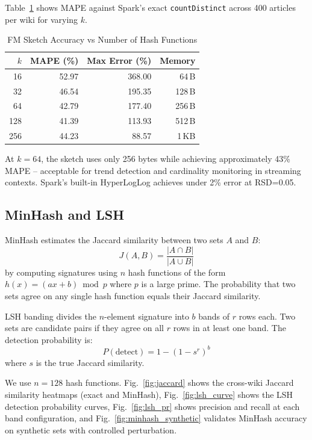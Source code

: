 \documentclass[conference]{IEEEtran}
\begin{document}
Table~\ref{tab:fm} shows MAPE against Spark's exact \texttt{countDistinct} across 400 articles per wiki for varying $k$.

\begin{table}[htbp]
\caption{FM Sketch Accuracy vs Number of Hash Functions}
\label{tab:fm}
\centering
\begin{tabular}{rrrr}
\toprule
$k$ & MAPE (\%) & Max Error (\%) & Memory \\
\midrule
16  & 52.97 & 368.00 & 64\,B  \\
32  & 46.54 & 195.35 & 128\,B \\
64  & 42.79 & 177.40 & 256\,B \\
128 & 41.39 & 113.93 & 512\,B \\
256 & 44.23 &  88.57 & 1\,KB  \\
\bottomrule
\end{tabular}
\end{table}

At $k=64$, the sketch uses only 256 bytes while achieving approximately 43\% MAPE -- acceptable for trend detection and cardinality monitoring in streaming contexts. Spark's built-in HyperLogLog achieves under 2\% error at RSD=0.05.

\subsection{MinHash and LSH}

MinHash \cite{broder1997} estimates the Jaccard similarity between two sets $A$ and $B$:
\begin{equation}
  J(A, B) = \frac{|A \cap B|}{|A \cup B|}
\end{equation}
by computing signatures using $n$ hash functions of the form $h(x) = (ax + b) \bmod p$ where $p$ is a large prime. The probability that two sets agree on any single hash function equals their Jaccard similarity.

LSH banding \cite{indyk1998} divides the $n$-element signature into $b$ bands of $r$ rows each. Two sets are candidate pairs if they agree on all $r$ rows in at least one band. The detection probability is:
\begin{equation}
  P(\text{detect}) = 1 - \left(1 - s^r\right)^b
\end{equation}
where $s$ is the true Jaccard similarity.

We use $n=128$ hash functions. Fig.~\ref{fig:jaccard} shows the cross-wiki Jaccard similarity heatmaps (exact and MinHash), Fig.~\ref{fig:lsh_curve} shows the LSH detection probability curves, Fig.~\ref{fig:lsh_pr} shows precision and recall at each band configuration, and Fig.~\ref{fig:minhash_synthetic} validates MinHash accuracy on synthetic sets with controlled perturbation.
\end{document}
